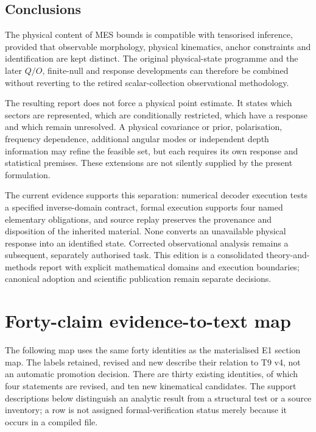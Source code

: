 \documentclass[
  11pt,
  a4paper]{article}
\begin{document}
\hypertarget{conclusions}{%
\subsection{Conclusions}\label{conclusions}}

The physical content of MES bounds is compatible with tensorised inference, provided that observable morphology, physical kinematics, anchor constraints and identification are kept distinct. The original physical-state programme and the later \(Q/O\), finite-null and response developments can therefore be combined without reverting to the retired scalar-collection observational methodology.

The resulting report does not force a physical point estimate. It states which sectors are represented, which are conditionally restricted, which have a response and which remain unresolved. A physical covariance or prior, polarisation, frequency dependence, additional angular modes or independent depth information may refine the feasible set, but each requires its own response and statistical premises. These extensions are not silently supplied by the present formulation.

The current evidence supports this separation: numerical decoder execution tests a specified inverse-domain contract, formal execution supports four named elementary obligations, and source replay preserves the provenance and disposition of the inherited material. None converts an unavailable physical response into an identified state. Corrected observational analysis remains a subsequent, separately authorised task. This edition is a consolidated theory-and-methods report with explicit mathematical domains and execution boundaries; canonical adoption and scientific publication remain separate decisions.

\appendix

\hypertarget{appendix-a.-forty-claim-evidence-to-text-map}{%
\section{Forty-claim evidence-to-text map}\label{appendix-a.-forty-claim-evidence-to-text-map}}

The following map uses the same forty identities as the materialised E1 section map. The labels retained, revised and new describe their relation to T9 v4, not an automatic promotion decision. There are thirty existing identities, of which four statements are revised, and ten new kinematical candidates. The support descriptions below distinguish an analytic result from a structural test or a source inventory; a row is not assigned formal-verification status merely because it occurs in a compiled file.
\end{document}
